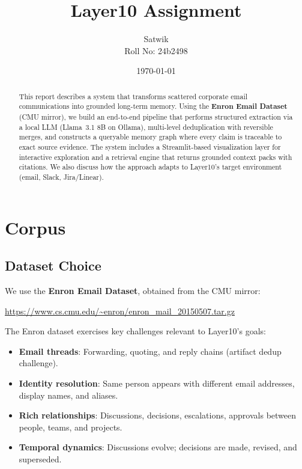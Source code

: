 \documentclass[11pt,a4paper]{article}
\title{
    \textbf{Layer10 Assignment}
}
\author{Satwik \\ \small Roll No: 24b2498}
\date{\today}
\begin{document}
\maketitle

\begin{abstract}
This report describes a system that transforms scattered corporate email communications into grounded long-term memory. Using the \textbf{Enron Email Dataset} (CMU mirror), we build an end-to-end pipeline that performs structured extraction via a local LLM (Llama~3.1 8B on Ollama), multi-level deduplication with reversible merges, and constructs a queryable memory graph where every claim is traceable to exact source evidence. The system includes a Streamlit-based visualization layer for interactive exploration and a retrieval engine that returns grounded context packs with citations. We also discuss how the approach adapts to Layer10's target environment (email, Slack, Jira/Linear).
\end{abstract}

\tableofcontents
\newpage

\section{Corpus}

\subsection{Dataset Choice}
We use the \textbf{Enron Email Dataset}, obtained from the CMU mirror:

\begin{center}
\url{https://www.cs.cmu.edu/~enron/enron_mail_20150507.tar.gz}
\end{center}

The Enron dataset exercises key challenges relevant to Layer10's goals:
\begin{itemize}[nosep]
    \item \textbf{Email threads}: Forwarding, quoting, and reply chains (artifact dedup challenge).
    \item \textbf{Identity resolution}: Same person appears with different email addresses, display names, and aliases.
    \item \textbf{Rich relationships}: Discussions, decisions, escalations, approvals between people, teams, and projects.
    \item \textbf{Temporal dynamics}: Discussions evolve; decisions are made, revised, and superseded.
\end{itemize}
\end{document}
